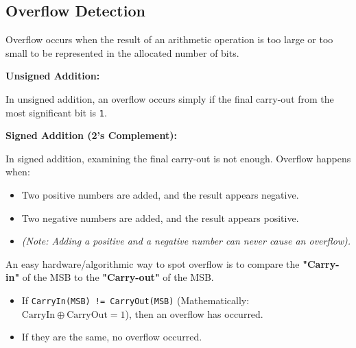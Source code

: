 \subsection{Overflow Detection}

\begin{definition}[Overflow]
Overflow occurs when the result of an arithmetic operation is too large or too small to be represented in the allocated number of bits.
\end{definition}

\textbf{Unsigned Addition:}

In unsigned addition, an overflow occurs simply if the final carry-out from the most significant bit is \texttt{1}.

\textbf{Signed Addition (2's Complement):}

In signed addition, examining the final carry-out is not enough. Overflow happens when:

\begin{itemize}
    \item Two positive numbers are added, and the result appears negative.
    \item Two negative numbers are added, and the result appears positive.
    \item \textit{(Note: Adding a positive and a negative number can never cause an overflow).}
\end{itemize}

\begin{theorem}
An easy hardware/algorithmic way to spot overflow is to compare the \textbf{"Carry-in"} of the MSB to the \textbf{"Carry-out"} of the MSB.

\begin{itemize}
    \item If \texttt{CarryIn(MSB) != CarryOut(MSB)} (Mathematically: $\text{CarryIn} \oplus \text{CarryOut} = 1$), then an overflow has occurred.
    \item If they are the same, no overflow occurred.
\end{itemize}

\end{theorem}
